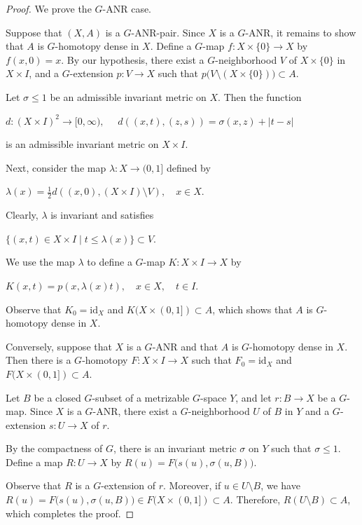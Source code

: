 \documentclass[12pt]{amsart}
\theoremstyle{definition}
\begin{document}
	\begin{proof} We prove the $G$-ANR case.
		
		Suppose that $(X,A)$ is a $G$-ANR-pair. Since  $X$ is a $G$-ANR, it remains to show that $A$ is $G$-homotopy dense in $X$.  Define a $G$-map $f: X\times \{0\}\rightarrow X$  by $f(x,0)=x$. By our hypothesis, there exist a $G$-neighborhood $V$ of $X\times \{0\}$ in $X\times I$, and a $G$-extension $p: V\rightarrow X$ such that $p\big(V\setminus (X\times \{0\})\big)\subset A$.
		
		Let $\sigma\leq 1$ be an admissible invariant metric on $X$. Then the function 
		
		\begin{center}
			$d:(X\times I)^2\rightarrow [0,\infty),\quad$ $d((x,t),(z,s))=\sigma(x,z)+|t-s|$
		\end{center}
		is an admissible invariant metric on $X\times I$.
		
		Next, consider the map $\lambda: X\rightarrow (0,1]$ defined by
		\begin{center}
			$\lambda(x)=\frac{1}{2}d((x,0), (X\times I)\setminus V),\quad x\in X$.
		\end{center} 
		
		Clearly, $\lambda$ is invariant	 and satisfies
		\begin{center}
			$\{(x,t)\in X\times I\mid t\leq \lambda(x)\}\subset V.$
		\end{center}
		
		We use the map $\lambda$ to define a $G$-map $K:X\times I\rightarrow X$ by 
		\begin{center}
			$K(x,t)=p(x,\lambda(x)t),\quad x\in X,\quad t\in I$.
		\end{center} 
		
		Observe that $K_0=\text{id}_X$ and $K(X\times (0,1])\subset A$, which shows that $A$ is $G$-homotopy dense in $X$.
		
		Conversely, suppose that $X$ is a $G$-ANR and that $A$ is $G$-homotopy dense in $X$. Then there is a $G$-homotopy $F: X\times I\rightarrow X$ such that $F_0=\mbox{id}_X$ and $F(X\times (0,1])\subset A$.
		
		Let $B$ be a closed $G$-subset of a metrizable $G$-space $Y$, and let $r : B \rightarrow X$ be a $G$-map. Since $X$ is a $G$-ANR, there exist a $G$-neighborhood $U$ of $B$ in $Y$ and a $G$-extension $s : U \to X$ of $r$.
		
		By the compactness of $G$, there is an invariant metric $\sigma$ on $Y$ such that $\sigma\leq 1$. Define a map $R: U\rightarrow X$ by $R(u)=F\big(s(u),\sigma(u, B)\big)$.
		
		Observe that $R$ is a $G$-extension of $r$. Moreover, if $u\in U\setminus B$, we have $R(u)=F\big(s(u),\sigma(u,B)\big)\in F(X\times (0,1])\subset A$. Therefore, $R(U \setminus B) \subset A$, which completes the proof.
	\end{proof}
	
\end{document}

